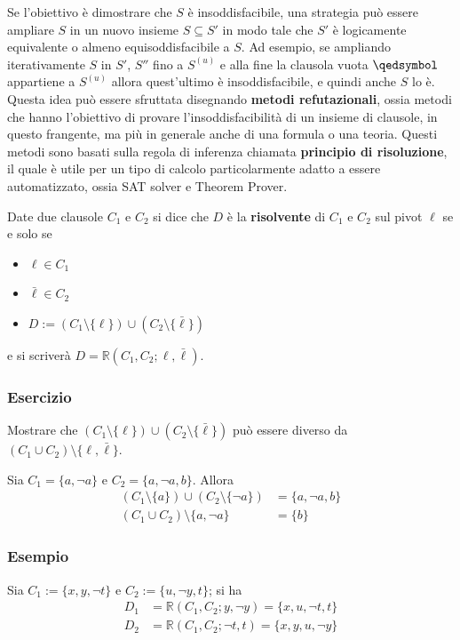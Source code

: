 Se l'obiettivo è dimostrare che $S$ è insoddisfacibile, una strategia 
può essere ampliare $S$ in un nuovo insieme $S \subseteq S'$ in modo 
tale che $S'$ è logicamente equivalente o almeno equisoddisfacibile a $S$.
Ad esempio, se ampliando iterativamente $S$ in $S'$, $S''$ fino a $S^{(u)}$ 
e alla fine la clausola vuota $\qedsymbol$ appartiene a $S^{(u)}$ allora quest'ultimo 
è insoddisfacibile, e quindi anche $S$ lo è. Questa idea può essere sfruttata 
disegnando \textbf{metodi refutazionali}, ossia metodi che hanno l'obiettivo di 
provare l'insoddisfacibilità di un insieme di clausole, in questo frangente, 
ma più in generale anche di una formula o una teoria. Questi metodi sono basati 
sulla regola di inferenza chiamata \textbf{principio di risoluzione}, 
il quale è utile per un tipo di calcolo particolarmente adatto a essere automatizzato, 
ossia SAT solver e Theorem Prover. 

\begin{defi}
        Date due clausole $C_1$ e $C_2$ si dice che $D$ è la \textbf{risolvente}
        di $C_1$ e $C_2$ sul pivot $\ell$ se e solo se
        \begin{itemize}
                \item $\ell \in C_1$
                \item $\bar{\ell} \in C_2$
                \item $D := (C_1 \setminus \{\ell\}) \cup (C_2 \setminus \{\bar{\ell}\})$
        \end{itemize}
       e si scriverà $D = \mathbb{R}(C_1,C_2; \ell, \bar{\ell})$. 
\end{defi}

\subsubsection{Esercizio}
Mostrare che $(C_1 \setminus \{\ell\}) \cup (C_2 \setminus \{\bar{\ell}\})$ può essere 
diverso da $(C_1 \cup C_2) \setminus \{\ell, \bar{\ell}\}$.

Sia $C_1 = \{a,\neg a\}$ e $C_2 = \{a, \neg a, b\}$. Allora
\begin{align*}
  (C_1 \setminus \{a\}) \cup (C_2 \setminus \{\neg a\}) & = \{a, \neg a, b\} \\
  (C_1 \cup C_2) \setminus \{a, \neg a\} & = \{b\}
\end{align*}
  

\subsubsection{Esempio}
Sia $C_1 := \{x, y, \neg t\}$ e $C_2 := \{u, \neg y, t\}$; si ha
\begin{align*}
D_1 & = \mathbb{R}(C_1, C_2; y, \neg y) = \{x, u, \neg t, t\} \\
D_2 & = \mathbb{R}(C_1, C_2; \neg t, t) = \{x, y, u, \neg y\}
\end{align*} 

